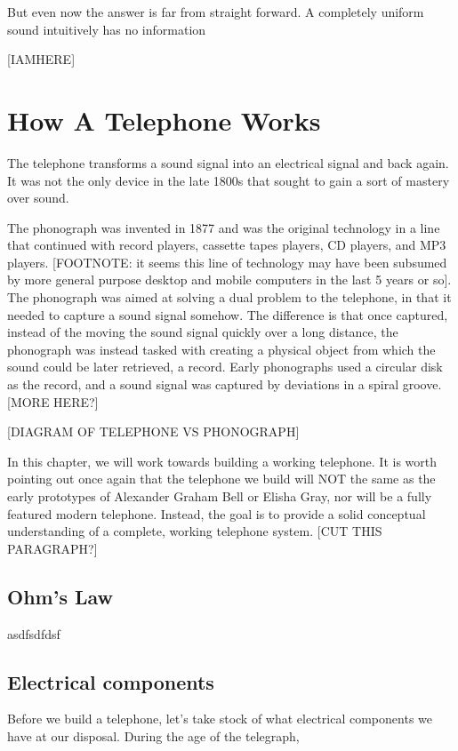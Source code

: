 \documentclass[UTF8]{book}
\begin{document}
\begin{CJK}{UTF8}{gbsn}
But even now the answer is far from straight forward. A completely uniform sound intuitively has no information

[IAMHERE]

\chapter{How A Telephone Works}

The telephone transforms a sound signal into an electrical signal and back again. It was not the only device in the late 1800s that sought to gain a sort of mastery over sound.

The phonograph was invented in 1877 and was the original technology in a line that continued with record players, cassette tapes players, CD players, and MP3 players. [FOOTNOTE: it seems this line of technology may have been subsumed by more general purpose desktop and mobile computers in the last 5 years or so]. The phonograph was aimed at solving a dual problem to the telephone, in that it needed to capture a sound signal somehow. The difference is that once captured, instead of the moving the sound signal quickly over a long distance, the phonograph was instead tasked with creating a physical object from which the sound could be later retrieved, a record. Early phonographs used a circular disk as the record, and a sound signal was captured by deviations in a spiral groove. [MORE HERE?]

[DIAGRAM OF TELEPHONE VS PHONOGRAPH]

In this chapter, we will work towards building a working telephone. It is worth pointing out once again that the telephone we build will NOT the same as the early prototypes of Alexander Graham Bell or Elisha Gray, nor will be a fully featured modern telephone. Instead, the goal is to provide a solid conceptual understanding of a complete, working telephone system. [CUT THIS PARAGRAPH?]

\section{Ohm's Law}

asdfsdfdsf

\section{Electrical components}

Before we build a telephone, let's take stock of what electrical components we have at our disposal. During the age of the telegraph,


\end{CJK}
\end{document}

